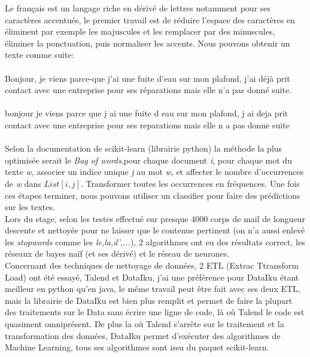 Le français est un langage riche en dérivé de lettres notamment pour ses caractères accentués, le premier travail est de réduire l'espace des caractères en éliminent par exemple les majuscules et les remplacer par des minuscules, éliminer la ponctuation, puis normaliser les accents. Nous pouvons obtenir un texte comme suite:
\\
\sepline\\
Bonjour, je viens parce-que j'ai une fuite d'eau sur mon plafond, j'ai déjà prit contact avec une entreprise pour ses réparations mais elle n'a pas donné suite.\\
\sepline\\
bonjour je viens parce que j ai une fuite d eau sur mon plafond, j ai deja prit contact avec une entreprise pour ses reparations mais elle n a pas donne suite\\
\sepline\\

Selon la documentation de scikit-learn (librairie python) la méthode la plus optimisée serait le \textit{Bag of words},pour chaque document \textit{i}, pour chaque mot du texte \textit{w}, associer un indice unique \textit{j} au mot \textit{w}, et affecter le nombre d'occurrences de \textit{w} dans $List[i,j]$. Transformer toutes les occurrences en fréquences. Une fois ces étapes terminer, nous pouvons utiliser un classifier pour faire des prédictions sur les textes.\\
Lors du stage, selon les testes effectué sur presque 4000 corps de mail de longueur descente et nettoyée pour ne laisser que le contenue pertinent (on n'a aussi enlevé les \textit{stopwords} comme les \textit{le,la,d',...}), 2 algorithmes ont eu des résultats correct, les réseaux  de bayes naïf (et ses dérivé) et le réseau de neurones.\\
\linebreak
Concernant des techniques de nettoyage de données, 2 ETL (Extrac Ttransform Load) ont été essayé, Talend et DataIku, j'ai une préférence pour DataIku étant meilleur en python qu'en java, le même travail peut être fait avec ses deux ETL, mais la librairie de DataIku est bien plus remplit et permet de faire la plupart des traitements sur le Data sans écrire une ligne de code, là où Talend le code est quasiment omniprésent. De plus la où Talend s'arrête sur le traitement et la transformation des données, DataIku permet d'exécuter des algorithmes de Machine Learning, tous ses algorithmes sont issu du paquet scikit-learn.
\pagebreak

